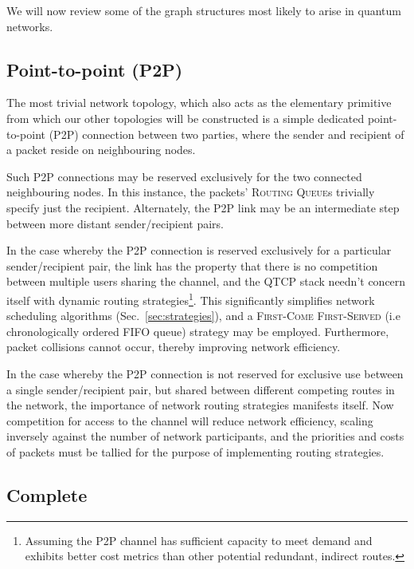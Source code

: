 \documentclass[aps, rmp, twocolumn, amsmath, amssymb, nofootinbib, superscriptaddress, longbibliography, floatfix, table-of-contents, eqsecnum]{revtex4-1}
\begin{document}
We will now review some of the graph structures most likely to arise in quantum networks.

%
%

\subsection{Point-to-point (P2P)} 

The most trivial network topology, which also acts as the elementary primitive from which our other topologies will be constructed is a simple dedicated point-to-point (P2P) connection between two parties, where the sender and recipient of a packet reside on neighbouring nodes.

Such P2P connections may be reserved exclusively for the two connected neighbouring nodes. In this instance, the packets' \textsc{Routing Queue}s trivially specify just the recipient. Alternately, the P2P link may be an intermediate step between more distant sender/recipient pairs.

In the case whereby the P2P connection is reserved exclusively for a particular sender/recipient pair, the link has the property that there is no competition between multiple users sharing the channel, and the QTCP stack needn't concern itself with dynamic routing strategies\footnote{Assuming the P2P channel has sufficient capacity to meet demand and exhibits better cost metrics than other potential redundant, indirect routes.}. This significantly simplifies network scheduling algorithms (Sec.~\ref{sec:strategies}), and a \textsc{First-Come First-Served} (i.e chronologically ordered FIFO queue) strategy may be employed. Furthermore, packet collisions cannot occur, thereby improving network efficiency.

In the case whereby the P2P connection is not reserved for exclusive use between a single sender/recipient pair, but shared between different competing routes in the network, the importance of network routing strategies manifests itself. Now competition for access to the channel will reduce network efficiency, scaling inversely against the number of network participants, and the priorities and costs of packets must be tallied for the purpose of implementing routing strategies.

%
%

\subsection{Complete} 
\end{document}
